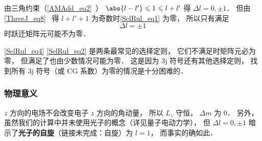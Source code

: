 由三角约束（\autoref{AMAdd_eq2}~） $\abs{l-l'} \leqslant 1 \leqslant l + l'$ 得 $\Delta l = 0, \pm 1$． 但由\autoref{ThreeJ_eq8}~ 得 $l + l' + 1$ 为奇数时\autoref{SelRul_eq1} 为零， 所以只有满足
\begin{equation}\label{SelRul_eq2}
 \Delta l = \pm 1
\end{equation}
时跃迁矩阵元可能不为零．

\autoref{SelRul_eq4} \autoref{SelRul_eq2} 是两条最常见的选择定则， 它们不满足时矩阵元必为零， 但满足了也由少数情况可能为零． 这是因为 3j 符号还有其他选择定则， 找到所有 3j 符号（或 CG 系数）为零的情况是十分困难的．

\subsubsection{物理意义}
$z$ 方向的电场不会改变电子 $z$ 方向的角动量， 所以 $L_z$ 守恒， $\Delta m$ 为 0． 另外， 虽然我们的计算中并未使用光子的概念（详见量子电动力学）， 但 $\Delta l = 0, \pm 1$ 暗示了\textbf{光子的自旋}（链接未完成：自旋）为 $l=1$， 而事实的确如此．
